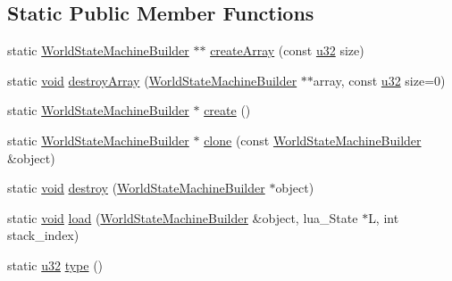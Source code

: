 \subsection*{Static Public Member Functions}
\begin{DoxyCompactItemize}
\item 
static \mbox{\hyperlink{classnjli_1_1_world_state_machine_builder}{World\+State\+Machine\+Builder}} $\ast$$\ast$ \mbox{\hyperlink{classnjli_1_1_world_state_machine_builder_a885f1bf64c1b4478218598e3a36d3061}{create\+Array}} (const \mbox{\hyperlink{_util_8h_a10e94b422ef0c20dcdec20d31a1f5049}{u32}} size)
\item 
static \mbox{\hyperlink{_thread_8h_af1e856da2e658414cb2456cb6f7ebc66}{void}} \mbox{\hyperlink{classnjli_1_1_world_state_machine_builder_a90956bf0dd6e90e79fe29336335a75bf}{destroy\+Array}} (\mbox{\hyperlink{classnjli_1_1_world_state_machine_builder}{World\+State\+Machine\+Builder}} $\ast$$\ast$array, const \mbox{\hyperlink{_util_8h_a10e94b422ef0c20dcdec20d31a1f5049}{u32}} size=0)
\item 
static \mbox{\hyperlink{classnjli_1_1_world_state_machine_builder}{World\+State\+Machine\+Builder}} $\ast$ \mbox{\hyperlink{classnjli_1_1_world_state_machine_builder_ac2aed386f8ffef5a860894d455b0b9e8}{create}} ()
\item 
static \mbox{\hyperlink{classnjli_1_1_world_state_machine_builder}{World\+State\+Machine\+Builder}} $\ast$ \mbox{\hyperlink{classnjli_1_1_world_state_machine_builder_a13011cd872e644fcf3982f21a59bbd5f}{clone}} (const \mbox{\hyperlink{classnjli_1_1_world_state_machine_builder}{World\+State\+Machine\+Builder}} \&object)
\item 
static \mbox{\hyperlink{_thread_8h_af1e856da2e658414cb2456cb6f7ebc66}{void}} \mbox{\hyperlink{classnjli_1_1_world_state_machine_builder_aca5fe85bd19979148c33b16f7b69c811}{destroy}} (\mbox{\hyperlink{classnjli_1_1_world_state_machine_builder}{World\+State\+Machine\+Builder}} $\ast$object)
\item 
static \mbox{\hyperlink{_thread_8h_af1e856da2e658414cb2456cb6f7ebc66}{void}} \mbox{\hyperlink{classnjli_1_1_world_state_machine_builder_ac0acd638fc8a471e9553a1b9cbedc2aa}{load}} (\mbox{\hyperlink{classnjli_1_1_world_state_machine_builder}{World\+State\+Machine\+Builder}} \&object, lua\+\_\+\+State $\ast$L, int stack\+\_\+index)
\item 
static \mbox{\hyperlink{_util_8h_a10e94b422ef0c20dcdec20d31a1f5049}{u32}} \mbox{\hyperlink{classnjli_1_1_world_state_machine_builder_a0306d9106c572c98b3adca2850d6e528}{type}} ()
\end{DoxyCompactItemize}
